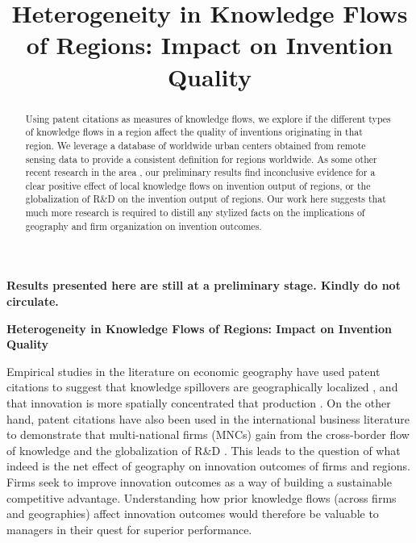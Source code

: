 \documentclass[12pt,letterpaper]{article}
\begin{document}
\setlength{\droptitle}{-5em}
\title{\textbf{\large Heterogeneity in Knowledge Flows of Regions: Impact on Invention Quality}}
\date{\vspace{-12ex}}

\maketitle
\thispagestyle{empty}
\renewcommand{\abstractname}{\normalsize ABSTRACT}
\begin{abstract}
\normalsize
\noindent Using patent citations as measures of knowledge flows, we explore if the different types of knowledge flows in a region affect the quality of inventions originating in that region. We leverage a database of worldwide urban centers  obtained from remote sensing data to provide a consistent definition for regions worldwide. As some other recent research in the area \citep{todo}, our preliminary results find inconclusive evidence for a clear positive effect of local knowledge flows on invention output of regions, or the globalization of R\&D on the invention output of regions. Our work here suggests that much more research is required to distill any stylized facts on the implications of geography and firm organization on invention outcomes. 
\end{abstract}
\vspace{50ex}
\textbf{Results presented here are still at a preliminary stage. Kindly do not circulate.}
\newpage
\pagestyle{fancy}
\fancyhf{}
\rhead{\thepage}

\textbf{Heterogeneity in Knowledge Flows of Regions: Impact on Invention Quality}

\vspace{3ex}


\noindent Empirical studies in the literature on economic geography have used patent citations to suggest that knowledge spillovers are geographically localized \citep*{Jaffe1993, Almeida1999, Bottazzi2003, Branstetter2001, Maurseth2002, Sonn2008}, and that innovation is more spatially concentrated that production \citep{Feldman1994a}. On the other hand, patent citations have also been used in the international business literature to demonstrate that multi-national firms (MNCs) gain from the cross-border flow of knowledge and the globalization of R\&D \citep{Singh2007, Zhao2006, Singh2013}. This leads to the question of what indeed is the net effect of geography on innovation outcomes of firms and regions. Firms seek to improve innovation outcomes as a way of building a sustainable competitive advantage. Understanding how prior knowledge flows (across firms and geographies) affect innovation outcomes would therefore be valuable to managers in their quest for superior performance. \par
\end{document}

